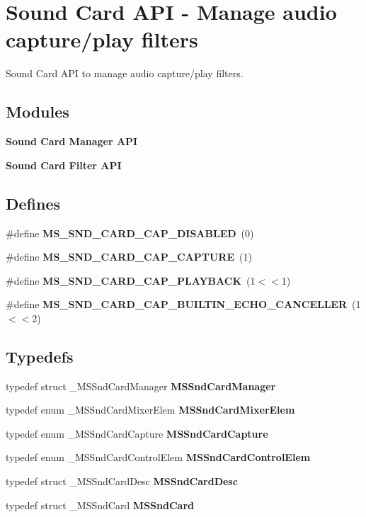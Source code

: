 \section{Sound Card API -\/ Manage audio capture/play filters}
\label{group__mediastreamer2__soundcard}


Sound Card API to manage audio capture/play filters.  
\subsection*{Modules}
\begin{DoxyCompactItemize}
\item 
{\bf Sound Card Manager API}
\item 
{\bf Sound Card Filter API}
\end{DoxyCompactItemize}
\subsection*{Defines}
\begin{DoxyCompactItemize}
\item 
\#define {\bf MS\_\-SND\_\-CARD\_\-CAP\_\-DISABLED}~(0)
\item 
\#define {\bf MS\_\-SND\_\-CARD\_\-CAP\_\-CAPTURE}~(1)
\item 
\#define {\bf MS\_\-SND\_\-CARD\_\-CAP\_\-PLAYBACK}~(1$<$$<$1)
\item 
\#define {\bf MS\_\-SND\_\-CARD\_\-CAP\_\-BUILTIN\_\-ECHO\_\-CANCELLER}~(1$<$$<$2)
\end{DoxyCompactItemize}
\subsection*{Typedefs}
\begin{DoxyCompactItemize}
\item 
typedef struct \_\-MSSndCardManager {\bf MSSndCardManager}
\item 
typedef enum \_\-MSSndCardMixerElem {\bf MSSndCardMixerElem}
\item 
typedef enum \_\-MSSndCardCapture {\bf MSSndCardCapture}
\item 
typedef enum \_\-MSSndCardControlElem {\bf MSSndCardControlElem}
\item 
typedef struct \_\-MSSndCardDesc {\bf MSSndCardDesc}
\item 
typedef struct \_\-MSSndCard {\bf MSSndCard}
\end{DoxyCompactItemize}


